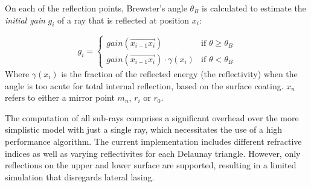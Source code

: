 On each of the reflection points, Brewster's angle $\theta_{B}$ is calculated to estimate the
\emph{initial gain} $g_i$ of a ray that is reflected at position $x_i$:

\begin{equation}
\label{eq:gain_reflection}
  g_i = 
  \begin{cases}
    gain(\overrightarrow{x_{i-1}x_i}) & \text{if } \theta \ge \theta_{B}  \\
    gain(\overrightarrow{x_{i-1}x_i}) \cdot \gamma(x_i) & \text{if } \theta < \theta_{B}   
  \end{cases}
\end{equation}
Where $\gamma(x_i)$ is the fraction of the reflected energy (the reflectivity)
when the angle is too acute for total internal reflection, based on the surface
coating. $x_n$ refers to
either a mirror point $m_n$, $r_i$ or $r_0$.

The computation of all sub-rays comprises a significant overhead over the more
simplistic model with just a single ray, which necessitates the use of a high
performance algorithm.  The current implementation includes different refractive
indices as well as varying reflectivites for each Delaunay triangle. However,
only reflections on the upper and lower surface are supported, resulting in a
limited simulation that disregards lateral lasing. 

